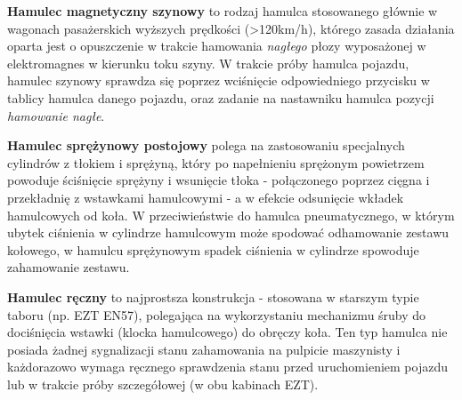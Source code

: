 \textbf{Hamulec magnetyczny szynowy} to rodzaj hamulca stosowanego głównie w wagonach pasażerskich wyższych prędkości (>120km/h), którego zasada działania oparta jest o opuszczenie w trakcie hamowania \textit{nagłego} płozy wyposażonej w elektromagnes w kierunku toku szyny. W trakcie próby hamulca pojazdu, hamulec szynowy sprawdza się poprzez wciśnięcie odpowiedniego przycisku w tablicy hamulca danego pojazdu, oraz zadanie na nastawniku hamulca pozycji \textit{hamowanie nagłe}.

\textbf{Hamulec sprężynowy postojowy} polega na zastosowaniu specjalnych cylindrów z tłokiem i sprężyną, który po napełnieniu sprężonym powietrzem powoduje ściśnięcie sprężyny i wsunięcie tłoka - połączonego poprzez cięgna i przekładnię z wstawkami hamulcowymi - a w efekcie odsunięcie wkładek hamulcowych od koła. W przeciwieństwie do hamulca pneumatycznego, w którym ubytek ciśnienia w cylindrze hamulcowym może spodować odhamowanie zestawu kołowego, w hamulcu sprężynowym spadek ciśnienia w cylindrze spowoduje zahamowanie zestawu.

\textbf{Hamulec ręczny} to najprostsza konstrukcja - stosowana w starszym typie taboru (np. EZT EN57), polegająca na wykorzystaniu mechanizmu śruby do dociśnięcia wstawki (klocka hamulcowego) do obręczy koła. Ten typ hamulca nie posiada żadnej sygnalizacji stanu zahamowania na pulpicie maszynisty i każdorazowo wymaga ręcznego sprawdzenia stanu przed uruchomieniem pojazdu lub w trakcie próby szczegółowej (w obu kabinach EZT).

